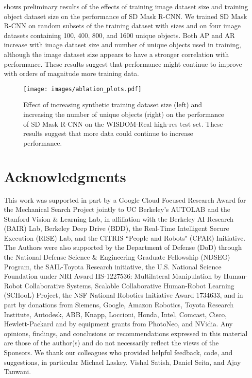 \documentclass[letterpaper, 10 pt, conference]{ieeeconf}  \pdfoutput=1
\numberwithin{equation}{section}
\begin{document}
 shows preliminary results of the effects of training image dataset size and training object dataset size on the performance of SD Mask R-CNN. We trained SD Mask R-CNN on random subsets of the training dataset with sizes  and on four  image datasets containing 100, 400, 800, and 1600 unique objects. Both AP and AR increase with image dataset size and number of unique objects used in training, although the image dataset size appears to have a stronger correlation with performance. These results suggest that performance might continue to improve with orders of magnitude more training data.

\begin{figure}[t!]
    \centering
    \texttt{[image: images/ablation\_plots.pdf]}
    \caption{Effect of increasing synthetic training dataset size (left) and increasing the number of unique objects (right) on the performance of SD Mask R-CNN on the WISDOM-Real high-res test set. These results suggest that more data could continue to increase performance.}
\end{figure} \section{Acknowledgments}
\footnotesize
This work was supported in part by a Google Cloud Focused Research Award for the Mechanical Search Project jointly to UC Berkeley's AUTOLAB and the Stanford Vision \& Learning Lab, in affiliation with the Berkeley AI Research (BAIR) Lab, Berkeley Deep Drive (BDD), the Real-Time Intelligent Secure Execution (RISE) Lab, and the CITRIS ``People and Robots" (CPAR) Initiative. The Authors were also supported by the Department of Defense (DoD) through the National Defense Science \& Engineering Graduate Fellowship (NDSEG) Program, the SAIL-Toyota Research initiative, the U.S. National Science Foundation under NRI Award IIS-1227536: Multilateral Manipulation by Human-Robot Collaborative Systems, Scalable Collaborative Human-Robot Learning (SCHooL) Project, the NSF National Robotics Initiative Award 1734633, and in part by donations from Siemens, Google, Amazon Robotics, Toyota Research Institute, Autodesk, ABB, Knapp, Loccioni, Honda, Intel, Comcast, Cisco, Hewlett-Packard and by equipment grants from PhotoNeo, and NVidia. Any opinions, findings, and conclusions or recommendations expressed in this material are those of the author(s) and do not necessarily reflect the views of the Sponsors. We thank our colleagues who provided helpful feedback, code, and suggestions, in particular Michael Laskey, Vishal Satish, Daniel Seita, and Ajay Tanwani.
\normalsize
\end{document}
